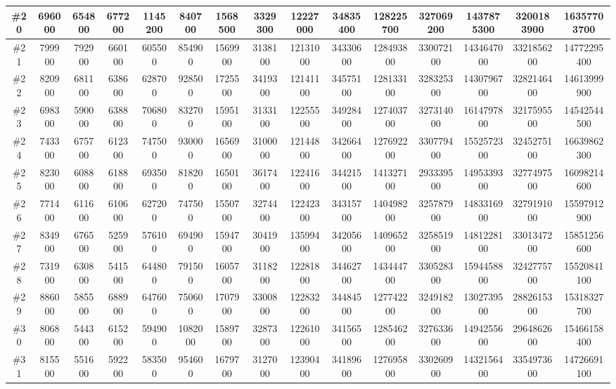 \documentclass[titlepage]{article}
\begin{document}
\begin{landscape}
\begin{table}[h]
\begin{tabular}{|c|c|c|c|c|c|c|c|c|c|c|c|c|c|c|}
			\hline
			\#20     & 696000  & 654800  & 677200 & 1145200 & 840700  & 1568500 & 3329300 & 12227000 & 34835400 & 128225700 & 327069200 & 1437875300 & 3200183900 & 16357703700  \\ 
			\hline
			\#21     & 799900  & 792900  & 660100 & 605500  & 854900  & 1569900 & 3138100 & 12131000 & 34330600 & 128493800 & 330072100 & 1434647000 & 3321856200 & 14772295400  \\ 
			\hline
			\#22     & 820900  & 681100  & 638600 & 628700  & 928500  & 1725500 & 3419300 & 12141100 & 34575100 & 128133100 & 328325300 & 1430796700 & 3282146400 & 14613999900  \\ 
			\hline
			\#23     & 698300  & 590000  & 638800 & 706800  & 832700  & 1595100 & 3133100 & 12255500 & 34928400 & 127403700 & 327314000 & 1614797800 & 3217595500 & 14542544500  \\ 
			\hline
			\#24     & 743300  & 675700  & 612300 & 747500  & 930000  & 1656900 & 3100000 & 12144800 & 34266400 & 127692200 & 330779400 & 1552572300 & 3245275100 & 16639862300  \\ 
			\hline
			\#25     & 823000  & 608800  & 618800 & 693500  & 818200  & 1650100 & 3617400 & 12241600 & 34421500 & 141327100 & 293339500 & 1495339300 & 3277497500 & 16098214600  \\ 
			\hline
			\#26     & 771400  & 611600  & 610600 & 627200  & 747500  & 1550700 & 3274400 & 12242300 & 34315700 & 140498200 & 325787900 & 1483316900 & 3279191000 & 15597912900  \\ 
			\hline
			\#27     & 834900  & 676500  & 525900 & 576100  & 694900  & 1594700 & 3041900 & 13599400 & 34205600 & 140965200 & 325851900 & 1481228100 & 3301347200 & 15851256600  \\ 
			\hline
			\#28     & 731900  & 630800  & 541500 & 644800  & 791500  & 1605700 & 3118200 & 12281800 & 34462700 & 143444700 & 330528300 & 1594458800 & 3242775700 & 15520841100  \\ 
			\hline
			\#29     & 886000  & 585500  & 688900 & 647600  & 750600  & 1707900 & 3300800 & 12283200 & 34484500 & 127742200 & 324918200 & 1302739500 & 2882615300 & 15318327700  \\ 
			\hline
			\#30     & 806800  & 544300  & 615200 & 594900  & 1082000 & 1589700 & 3287300 & 12261000 & 34156500 & 128546200 & 327633600 & 1494255600 & 2964862600 & 15466158400  \\ 
			\hline
			\#31     & 815500  & 551600  & 592200 & 583500  & 954600  & 1679700 & 3127000 & 12390400 & 34189600 & 127695800 & 330260900 & 1432156400 & 3354973600 & 14726691100  \\ 

\end{tabular}
\end{table}
\end{landscape}
\end{document}
